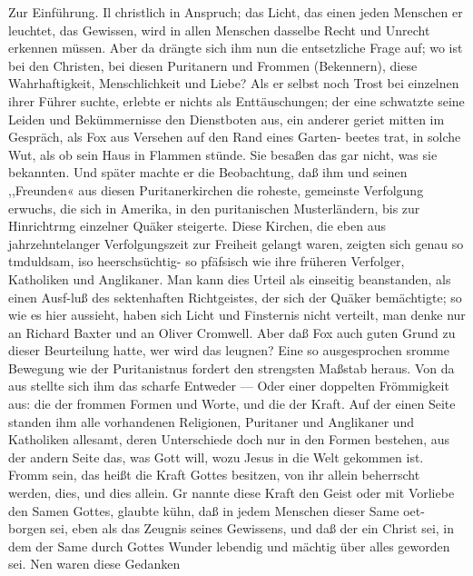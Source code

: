 Zur Einführung. Il
christlich in Anspruch; das Licht, das einen jeden Menschen er
leuchtet, das Gewissen, wird in allen Menschen dasselbe Recht
und Unrecht erkennen müssen.
Aber da drängte sich ihm nun die entsetzliche Frage auf;
wo ist bei den Christen, bei diesen Puritanern und Frommen
(Bekennern), diese Wahrhaftigkeit, Menschlichkeit und Liebe? Als
er selbst noch Trost bei einzelnen ihrer Führer suchte, erlebte er
nichts als Enttäuschungen; der eine schwatzte seine Leiden und
Bekümmernisse den Dienstboten aus, ein anderer geriet mitten
im Gespräch, als Fox aus Versehen auf den Rand eines Garten-
beetes trat, in solche Wut, als ob sein Haus in Flammen stünde.
Sie besaßen das gar nicht, was sie bekannten. Und später machte
er die Beobachtung, daß ihm und seinen ,,Freunden« aus diesen
Puritanerkirchen die roheste, gemeinste Verfolgung erwuchs, die
sich in Amerika, in den puritanischen Musterländern, bis zur
Hinrichtrmg einzelner Quäker steigerte. Diese Kirchen, die eben
aus jahrzehntelanger Verfolgungszeit zur Freiheit gelangt waren,
zeigten sich genau so tmduldsam, iso heerschsüchtig- so pfäfsisch
wie ihre früheren Verfolger, Katholiken und Anglikaner. Man
kann dies Urteil als einseitig beanstanden, als einen Ausf-luß des
sektenhaften Richtgeistes, der sich der Quäker bemächtigte; so wie
es hier aussieht, haben sich Licht und Finsternis nicht verteilt,
man denke nur an Richard Baxter und an Oliver Cromwell.
Aber daß Fox auch guten Grund zu dieser Beurteilung hatte, wer
wird das leugnen? Eine so ausgesprochen sromme Bewegung
wie der Puritanistnus fordert den strengsten Maßstab heraus.
Von da aus stellte sich ihm das scharfe Entweder — Oder
einer doppelten Frömmigkeit aus: die der frommen Formen und
Worte, und die der Kraft. Auf der einen Seite standen ihm alle
vorhandenen Religionen, Puritaner und Anglikaner und Katholiken
allesamt, deren Unterschiede doch nur in den Formen bestehen,
aus der andern Seite das, was Gott will, wozu Jesus in die
Welt gekommen ist. Fromm sein, das heißt die Kraft Gottes
besitzen, von ihr allein beherrscht werden, dies, und dies allein.
Gr nannte diese Kraft den Geist oder mit Vorliebe den Samen
Gottes, glaubte kühn, daß in jedem Menschen dieser Same oet-
borgen sei, eben als das Zeugnis seines Gewissens, und daß der
ein Christ sei, in dem der Same durch Gottes Wunder lebendig
und mächtig über alles geworden sei. Nen waren diese Gedanken


